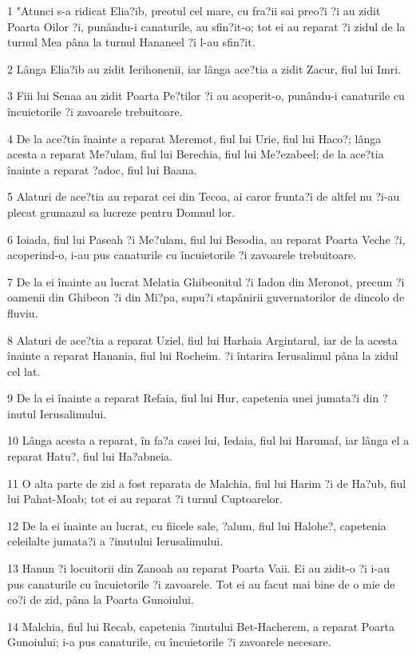 \par 1 "Atunci s-a ridicat Elia?ib, preotul cel mare, cu fra?ii sai preo?i ?i au zidit Poarta Oilor ?i, punându-i canaturile, au sfin?it-o; tot ei au reparat ?i zidul de la turnul Mea pâna la turnul Hananeel ?i l-au sfin?it.
\par 2 Lânga Elia?ib au zidit Ierihonenii, iar lânga ace?tia a zidit Zacur, fiul lui Imri.
\par 3 Fiii lui Senaa au zidit Poarta Pe?tilor ?i au acoperit-o, punându-i canaturile cu încuietorile ?i zavoarele trebuitoare.
\par 4 De la ace?tia înainte a reparat Meremot, fiul lui Urie, fiul lui Haco?; lânga acesta a reparat Me?ulam, fiul lui Berechia, fiul lui Me?ezabeel; de la ace?tia înainte a reparat ?adoc, fiul lui Baana.
\par 5 Alaturi de ace?tia au reparat cei din Tecoa, ai caror frunta?i de altfel nu ?i-au plecat grumazul sa lucreze pentru Domnul lor.
\par 6 Ioiada, fiul lui Paseah ?i Me?ulam, fiul lui Besodia, au reparat Poarta Veche ?i, acoperind-o, i-au pus canaturile cu încuietorile ?i zavoarele trebuitoare.
\par 7 De la ei înainte au lucrat Melatia Ghibeonitul ?i Iadon din Meronot, precum ?i oamenii din Ghibeon ?i din Mi?pa, supu?i stapânirii guvernatorilor de dincolo de fluviu.
\par 8 Alaturi de ace?tia a reparat Uziel, fiul lui Harhaia Argintarul, iar de la acesta înainte a reparat Hanania, fiul lui Rocheim. ?i întarira Ierusalimul pâna la zidul cel lat.
\par 9 De la ei înainte a reparat Refaia, fiul lui Hur, capetenia unei jumata?i din ?inutul Ierusalimului.
\par 10 Lânga acesta a reparat, în fa?a casei lui, Iedaia, fiul lui Harumaf, iar lânga el a reparat Hatu?, fiul lui Ha?abneia.
\par 11 O alta parte de zid a fost reparata de Malchia, fiul lui Harim ?i de Ha?ub, fiul lui Pahat-Moab; tot ei au reparat ?i turnul Cuptoarelor.
\par 12 De la ei înainte au lucrat, cu fiicele sale, ?alum, fiul lui Halohe?, capetenia celeilalte jumata?i a ?inutului Ierusalimului.
\par 13 Hanun ?i locuitorii din Zanoah au reparat Poarta Vaii. Ei au zidit-o ?i i-au pus canaturile cu încuietorile ?i zavoarele. Tot ei au facut mai bine de o mie de co?i de zid, pâna la Poarta Gunoiului.
\par 14 Malchia, fiul lui Recab, capetenia ?inutului Bet-Hacherem, a reparat Poarta Gunoiului; i-a pus canaturile, cu încuietorile ?i zavoarele necesare.
